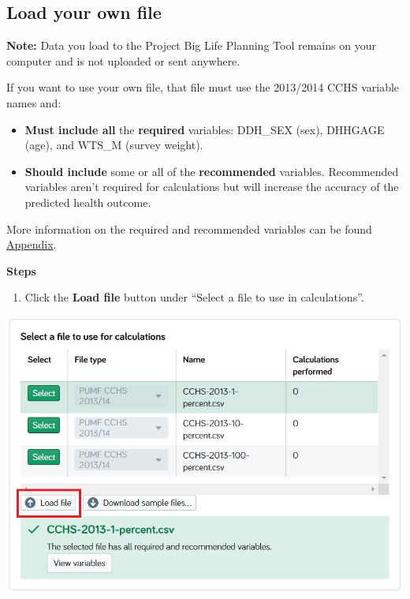 \documentclass[]{book}
\providecommand{\tightlist}{%
  \setlength{\itemsep}{0pt}\setlength{\parskip}{0pt}}
\begin{document}
\subsection{Load your own file}\label{load-your-own-file}

\textbf{Note:} Data you load to the Project Big Life Planning Tool
remains on your computer and is not uploaded or sent anywhere.

If you want to use your own file, that file must use the 2013/2014 CCHS
variable names and:

\begin{itemize}
\item
  \textbf{Must include all} the \textbf{required} variables: DDH\_SEX
  (sex), DHHGAGE (age), and WTS\_M (survey weight).
\item
  \textbf{Should include} some or all of the \textbf{recommended}
  variables. Recommended variables aren't required for calculations but
  will increase the accuracy of the predicted health outcome.
\end{itemize}

More information on the required and recommended variables can be found
\protect\hyperlink{mport}{Appendix}.

\textbf{Steps}

\begin{enumerate}
\def\labelenumi{\arabic{enumi}.}
\tightlist
\item
  Click the \textbf{Load file} button under ``Select a file to use in
  calculations''.
\end{enumerate}

\begin{center}\includegraphics{Images/Datafiles-Load} \end{center}
\end{document}
